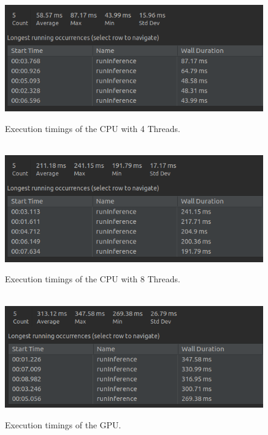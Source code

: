 \documentclass{article}
\begin{document}
\begin{figure}[h]\
    \includegraphics[width=\textwidth]{CPU4_Time.png}
    \caption{Execution timings of the CPU with 4 Threads.}
    \label{fig:cpu4}
\end{figure}

\begin{figure}[h]\
    \includegraphics[width=\textwidth]{CPU8_Time.png}
    \caption{Execution timings of the CPU with 8 Threads.}
    \label{fig:cpu8}
\end{figure}

\begin{figure}[h]\
    \includegraphics[width=\textwidth]{GPU_Time.png}
    \caption{Execution timings of the GPU.}
    \label{fig:gpu}
\end{figure}

\break
\end{document}
